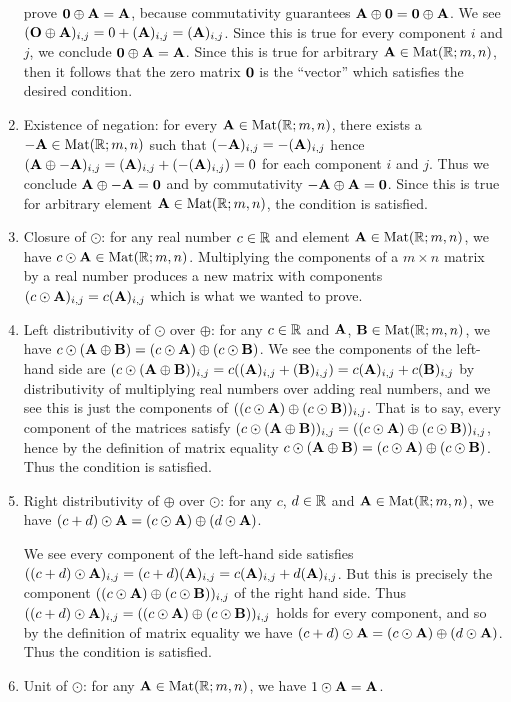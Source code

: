 \begin{example}
\begin{enumerate}[label=(\arabic*)]
  prove $\mathbf{0}\oplus\mathbf{A}=\mathbf{A}$, because commutativity guarantees $\mathbf{A}\oplus\mathbf{0}=\mathbf{0}\oplus\mathbf{A}$.
  We see $(\mathbf{O}\oplus\mathbf{A})_{i,j} = 0 + (\mathbf{A})_{i,j} = (\mathbf{A})_{i,j}$.
  Since this is true for every component $i$ and $j$, we conclude
  $\mathbf{0}\oplus\mathbf{A}=\mathbf{A}$. Since this is true for arbitrary
  $\mathbf{A}\in\mathrm{Mat}(\mathbb{R};m,n)$, then it follows that the zero matrix
  $\mathbf{0}$ is the ``vector'' which satisfies the desired condition.
\item Existence of negation: for every $\mathbf{A}\in\mathrm{Mat}(\mathbb{R};m,n)$,
  there exists a $-\mathbf{A}\in\mathrm{Mat}(\mathbb{R};m,n)$ such that
  $(-\mathbf{A})_{i,j} = -(\mathbf{A})_{i,j}$ hence
  $(\mathbf{A}\oplus-\mathbf{A})_{i,j} = (\mathbf{A})_{i,j}+(-(\mathbf{A})_{i,j}) = 0$
  for each component $i$ and $j$. Thus we conclude
  $\mathbf{A}\oplus-\mathbf{A}=\mathbf{0}$ and by commutativity
  $-\mathbf{A}\oplus\mathbf{A}=\mathbf{0}$.
  Since this is true for arbitrary element $\mathbf{A}\in\mathrm{Mat}(\mathbb{R};m,n)$,
  the condition is satisfied.
\item Closure of $\odot$: for any real number $c\in\mathbb{R}$ and element
  $\mathbf{A}\in\mathrm{Mat}(\mathbb{R};m,n)$, we have $c\odot\mathbf{A}\in\mathrm{Mat}(\mathbb{R};m,n)$.
  Multiplying the components of a $m\times n$ matrix by a real number
  produces a new matrix with components $(c\odot\mathbf{A})_{i,j}=c(\mathbf{A})_{i,j}$
  which is what we wanted to prove.
\item Left distributivity of $\odot$ over $\oplus$:
  for any $c\in\mathbb{R}$ and
  $\mathbf{A}$, $\mathbf{B}\in\mathrm{Mat}(\mathbb{R};m,n)$, we have
  $c\odot(\mathbf{A}\oplus\mathbf{B}) = (c\odot\mathbf{A})\oplus(c\odot\mathbf{B})$.
  We see the components of the left-hand side are
  $(c\odot(\mathbf{A}\oplus\mathbf{B}))_{i,j} = c((\mathbf{A})_{i,j} + (\mathbf{B})_{i,j}) = c(\mathbf{A})_{i,j} + c(\mathbf{B})_{i,j}$
  by distributivity of multiplying real numbers over adding real
  numbers, and we see this is just the components of
  $((c\odot\mathbf{A})\oplus(c\odot\mathbf{B}))_{i,j}$. That is to say, every
  component of the matrices satisfy
  $(c\odot(\mathbf{A}\oplus\mathbf{B}))_{i,j} = ((c\odot\mathbf{A})\oplus(c\odot\mathbf{B}))_{i,j}$,
  hence by the definition of matrix equality
  $c\odot(\mathbf{A}\oplus\mathbf{B}) = (c\odot\mathbf{A})\oplus(c\odot\mathbf{B})$.
  Thus the condition is satisfied.
\item Right distributivity of $\oplus$ over $\odot$:
  for any $c$, $d\in\mathbb{R}$ and $\mathbf{A}\in\mathrm{Mat}(\mathbb{R};m,n)$, we have
  $(c+d)\odot\mathbf{A} = (c\odot\mathbf{A})\oplus(d\odot\mathbf{A})$.

  We see every component of the left-hand side satisfies
  $((c+d)\odot\mathbf{A})_{i,j} = (c+d)(\mathbf{A})_{i,j} = c(\mathbf{A})_{i,j} + d(\mathbf{A})_{i,j}$.
  But this is precisely the component
  $((c\odot\mathbf{A})\oplus(c\odot\mathbf{B}))_{i,j}$ of the right hand
  side. Thus
  $((c+d)\odot\mathbf{A})_{i,j} = ((c\odot\mathbf{A})\oplus(c\odot\mathbf{B}))_{i,j}$
  holds for every component, and so by the definition of matrix equality
  we have $(c+d)\odot\mathbf{A} = (c\odot\mathbf{A})\oplus(d\odot\mathbf{A})$.
  Thus the condition is satisfied.
\item Unit of $\odot$: for any $\mathbf{A}\in\mathrm{Mat}(\mathbb{R};m,n)$, we have
  $1\odot\mathbf{A}=\mathbf{A}$.


\end{enumerate}
\end{example}

